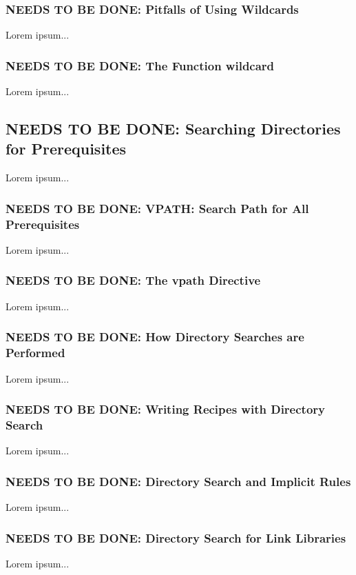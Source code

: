 \documentclass{charun}
\begin{document}
\begin{multicols*}{2}
\color{gray}
\subsubsection{NEEDS TO BE DONE: Pitfalls of Using Wildcards}
Lorem ipsum...
\color{black}

\color{gray}
\subsubsection{NEEDS TO BE DONE: The Function wildcard}
Lorem ipsum...
\color{black}

\color{gray}
\subsection{NEEDS TO BE DONE: Searching Directories for Prerequisites}
Lorem ipsum...
\color{black}

\color{gray}
\subsubsection{NEEDS TO BE DONE: VPATH: Search Path for All Prerequisites}
Lorem ipsum...
\color{black}

\color{gray}
\subsubsection{NEEDS TO BE DONE: The vpath Directive}
Lorem ipsum...
\color{black}

\color{gray}
\subsubsection{NEEDS TO BE DONE: How Directory Searches are Performed}
Lorem ipsum...
\color{black}

\color{gray}
\subsubsection{NEEDS TO BE DONE: Writing Recipes with Directory Search}
Lorem ipsum...
\color{black}

\color{gray}
\subsubsection{NEEDS TO BE DONE: Directory Search and Implicit Rules}
Lorem ipsum...
\color{black}

\color{gray}
\subsubsection{NEEDS TO BE DONE: Directory Search for Link Libraries}
Lorem ipsum...
\color{black}


\end{multicols*}
\end{document}
